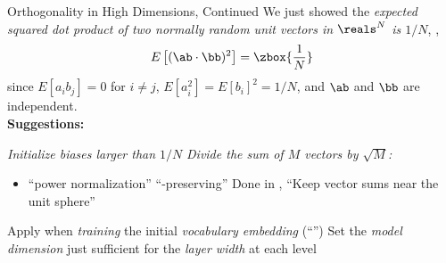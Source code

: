 \begin{slide}[\slideopts,toc={}]{Orthogonality in High Dimensions, Continued}
\vspace{-1em}
We just showed the \emph{expected squared dot product of two normally random unit vectors in $\reals^N$ is $1/N$}, \ie,
\[
E\left[(\ab \cdot \bb)^2\right] = \zbox{\frac{1}{N}}
\]
since $E[a_i b_j]=0$ for $i \ne j$, $E[a_i^2] = E[b_i]^2 = 1/N$, and $\ab$ and $\bb$ are independent.\\
\maybepause
\textbf{Suggestions:}
\begin{itemize}
\mpitem \emph{Initialize biases larger than $1/N$}
\mpitem \emph{Divide the sum of $M$ vectors by $\sqrt{M}$:}
\begin{itemize}
  \item ``power normalization''
  \mpitem ``-preserving''
  \mpitem Done in , \eg
  \mpitem ``Keep vector sums near the unit sphere''
\end{itemize}
\mpitem Apply  when \emph{training} the initial \emph{vocabulary embedding} (``'')
\mpitem Set the \emph{model dimension} just sufficient for the \emph{layer width} at each level
\end{itemize}

\end{slide}

